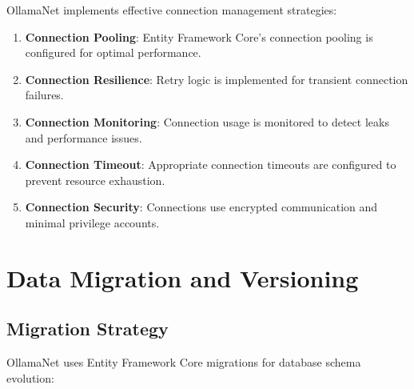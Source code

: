 OllamaNet implements effective connection management strategies:

\begin{enumerate}
   \item \textbf{Connection Pooling}: Entity Framework Core's connection pooling is configured for optimal performance.

   \item \textbf{Connection Resilience}: Retry logic is implemented for transient connection failures.

   \item \textbf{Connection Monitoring}: Connection usage is monitored to detect leaks and performance issues.

   \item \textbf{Connection Timeout}: Appropriate connection timeouts are configured to prevent resource exhaustion.

   \item \textbf{Connection Security}: Connections use encrypted communication and minimal privilege accounts.
\end{enumerate}

\section{Data Migration and Versioning}

\subsection{Migration Strategy}

OllamaNet uses Entity Framework Core migrations for database schema evolution:

